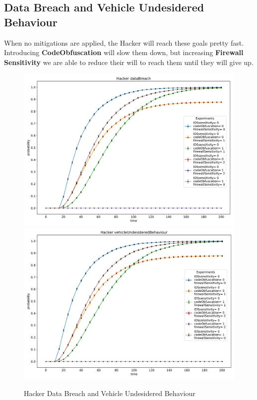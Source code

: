 \subsection*{Data Breach and Vehicle Undesidered Behaviour}
When no mitigations are applied, the Hacker will reach these goals pretty fast. Introducing \textbf{CodeObfuscation}
will slow them down, but increasing \textbf{Firewall Sensitivity} we are able to reduce their will to reach them
until they will give up. 
\begin{figure}[H]
    \begin{center}
        \includegraphics[scale=0.4]{img/Hacker_dataBreach.pdf}
        \includegraphics[scale=0.4]{img/Hacker_vOB.pdf}
    \end{center}
    \caption{Hacker Data Breach and Vehicle Undesidered Behaviour}
    \label{fig:Hacker_dataBreach}
    \vspace*{-2cm}
\end{figure}
